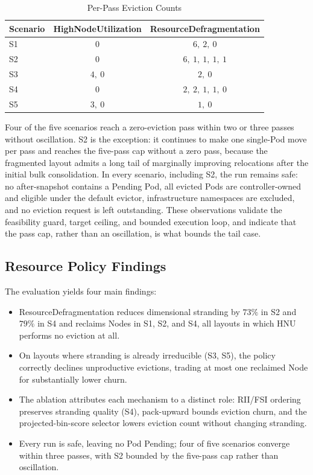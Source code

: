 \begin{table}[tbp]
    \centering
    \caption{Per-Pass Eviction Counts}
    \label{tab:defrag_convergence}
    \begin{tabular}{@{}l c c@{}}
        \hline
        \textbf{Scenario} & \textbf{HighNodeUtilization} & \textbf{ResourceDefragmentation} \\
        \hline
        S1 & \(0\) & \(6,\ 2,\ 0\) \\
        S2 & \(0\) & \(6,\ 1,\ 1,\ 1,\ 1\) \\
        S3 & \(4,\ 0\) & \(2,\ 0\) \\
        S4 & \(0\) & \(2,\ 2,\ 1,\ 1,\ 0\) \\
        S5 & \(3,\ 0\) & \(1,\ 0\) \\
        \hline
    \end{tabular}
\end{table}

Four of the five scenarios reach a zero-eviction pass within two or three passes without oscillation. S2 is the exception: it continues to make one single-Pod move per pass and reaches the five-pass cap without a zero pass, because the fragmented layout admits a long tail of marginally improving relocations after the initial bulk consolidation. In every scenario, including S2, the run remains safe: no after-snapshot contains a Pending Pod, all evicted Pods are controller-owned and eligible under the default evictor, infrastructure namespaces are excluded, and no eviction request is left outstanding. These observations validate the feasibility guard, target ceiling, and bounded execution loop, and indicate that the pass cap, rather than an oscillation, is what bounds the tail case.

\subsection{Resource Policy Findings}
\label{sec:defrag_findings}

The evaluation yields four main findings:

\begin{itemize}
    \item ResourceDefragmentation reduces dimensional stranding by \(73\%\) in S2 and \(79\%\) in S4 and reclaims Nodes in S1, S2, and S4, all layouts in which HNU performs no eviction at all.
    \item On layouts where stranding is already irreducible (S3, S5), the policy correctly declines unproductive evictions, trading at most one reclaimed Node for substantially lower churn.
    \item The ablation attributes each mechanism to a distinct role: RII/FSI ordering preserves stranding quality (S4), pack-upward bounds eviction churn, and the projected-bin-score selector lowers eviction count without changing stranding.
    \item Every run is safe, leaving no Pod Pending; four of five scenarios converge within three passes, with S2 bounded by the five-pass cap rather than oscillation.
\end{itemize}

